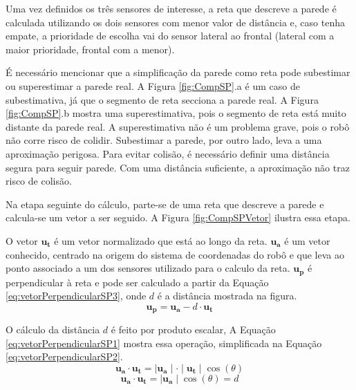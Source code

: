 		
		
		Uma vez definidos os três sensores de interesse, a reta que descreve a parede é calculada 
		utilizando os dois sensores com menor valor de distância e, caso tenha empate, a 
		prioridade de escolha vai do sensor lateral ao frontal (lateral com a maior prioridade, 
		frontal com a menor). 
		
		É necessário mencionar que a simplificação da parede como reta pode subestimar ou 
		superestimar a parede real. A Figura \ref{fig:CompSP}.a é um caso de subestimativa, já 
		que o segmento de reta secciona a parede real. A Figura \ref{fig:CompSP}.b mostra uma 
		superestimativa, pois o segmento de reta está muito distante da parede real. A 
		superestimativa não é um problema grave, pois o robô não corre risco de colidir. 
		Subestimar a parede, por outro lado, leva a uma aproximação perigosa. Para evitar 
		colisão, é necessário definir uma distância segura para seguir parede. Com uma distância
		suficiente, a aproximação não traz risco de colisão.
		
		Na etapa seguinte do cálculo, parte-se de uma reta que descreve a parede e calcula-se um
		vetor a ser seguido. A Figura \ref{fig:CompSPVetor} ilustra essa etapa. 

		
		
		O vetor $\mathbf{u_t}$ é um vetor normalizado que está ao longo da reta. $\mathbf{u_a}$ 
		é um vetor conhecido, centrado na origem do sistema de coordenadas do robô e que leva ao 
		ponto associado a um dos sensores utilizado para o calculo da reta. $\mathbf{u_p}$ é
		perpendicular à reta e pode ser calculado a partir da Equação 
		\ref{eq:vetorPerpendicularSP3}, onde $d$ é a distância mostrada na figura.
		\begin{equation}
			\label{eq:vetorPerpendicularSP3}
			\mathbf{u_p} = \mathbf{u_a} - d \cdot \mathbf{u_t}
		\end{equation}
		
		O cálculo da distância $d$ é feito por produto escalar, A Equação 
		\ref{eq:vetorPerpendicularSP1} mostra essa operação, simplificada na Equação 
		\ref{eq:vetorPerpendicularSP2}. 
		\begin{equation}
			\label{eq:vetorPerpendicularSP1}
			\mathbf{u_a} \cdot \mathbf{u_t} = \mid \mathbf{u_a} \mid \cdot \mid \mathbf{u_t} \mid \cos(\theta)
		\end{equation}
		\begin{equation}
			\label{eq:vetorPerpendicularSP2}
			\mathbf{u_a} \cdot \mathbf{u_t} = \mid \mathbf{u_a} \mid \cos(\theta) = d
		\end{equation}
		
